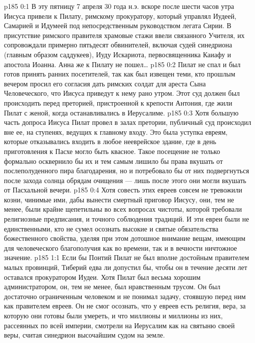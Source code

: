 \author{Комиссия срединников}
\vs p185 0:1 В эту пятницу 7 апреля 30 года н.э. вскоре после шести часов утра Иисуса привели к Пилату, римскому прокуратору, который управлял Иудеей, Самарией и Идумеей под непосредственным руководством легата Сирии. В присутствие римского правителя храмовые стажи ввели связанного Учителя, их сопровождали примерно пятьдесят обвинителей, включая судей синедриона (главным образом саддукеев), Иуду Искариота, первосвященника Каиафу и апостола Иоанна. Анна же к Пилату не пошел\ldots
\vs p185 0:2 Пилат не спал и был готов принять ранних посетителей, так как был извещен теми, кто прошлым вечером просил его согласия дать римских солдат для ареста Сына Человеческого, что Иисуса приведут к нему рано утром. Этот суд должен был происходить перед преторией, пристроенной к крепости Антония, где жили Пилат с женой, когда останавливались в Иерусалиме.
\vs p185 0:3 Хотя большую часть допроса Иисуса Пилат провел в залах претории, публичный суд происходил вне ее, на ступенях, ведущих к главному входу. Это была уступка евреям, которые отказывались входить в любое нееврейское здание, где в день приготовления к Пасхе могло быть квасное. Такое посещение не только формально осквернило бы их и тем самым лишило бы права вкушать от послеполуденного пира благодарения, но и потребовало бы от них подвергнуться после захода солнца обрядам очищения --- лишь после этого они могли вкушать от Пасхальной вечери.
\vs p185 0:4 Хотя совесть этих евреев совсем не тревожили козни, чинимые ими, дабы вынести смертный приговор Иисусу, они, тем не менее, были крайне щепетильны во всех вопросах чистоты, которой требовали религиозные предписания, и точного соблюдения традиций. И эти евреи были не единственными, кто не сумел осознать высокие и святые обязательства божественного свойства, уделяя при этом дотошное внимание вещам, имеющим для человеческого благополучия как во времени, так и в вечности ничтожное значение.
\vs p185 1:1 Если бы Понтий Пилат не был вполне достойным правителем малых провинций, Тиберий едва ли допустил бы, чтобы он в течение десяти лет оставался прокуратором Иудеи. Хотя Пилат был весьма хорошим администратором, он, тем не менее, был нравственным трусом. Он был достаточно ограниченным человеком и не понимал задачу, стоявшую перед ним как правителем евреев. Он не смог осознать, что у евреев есть  религия, вера, за которую они готовы были умереть, и что миллионы и миллионы из них, рассеянных по всей империи, смотрели на Иерусалим как на святыню своей веры, считая синедрион высочайшим судом на земле.
